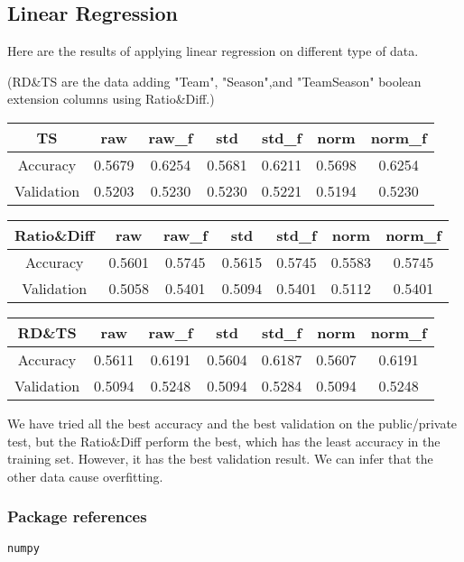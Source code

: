 \subsection*{Linear Regression}

Here are the results of applying linear regression on different type of data.

\noindent
(RD\&TS are the data adding "Team", "Season",and "TeamSeason" boolean extension columns using Ratio\&Diff.) \\

\vspace{6pt}

\begin{tabular}{|c|c|c|c|c|c|c|}
    \hline
    TS         & raw    & raw\_f & std    & std\_f & norm   & norm\_f \\\hline
    Accuracy   & 0.5679 & 0.6254 & 0.5681 & 0.6211 & 0.5698 & 0.6254 \\\hline
    Validation & 0.5203 & 0.5230 & 0.5230 & 0.5221 & 0.5194 & 0.5230 \\\hline
\end{tabular}

\vspace{12pt}

\begin{tabular}{|c|c|c|c|c|c|c|}
    \hline
    Ratio\&Diff& raw    & raw\_f & std    & std\_f & norm   & norm\_f \\\hline
    Accuracy   & 0.5601 & 0.5745 & 0.5615 & 0.5745 & 0.5583 & 0.5745 \\\hline
    Validation & 0.5058 & 0.5401 & 0.5094 & 0.5401 & 0.5112 & 0.5401 \\\hline
\end{tabular}

\vspace{12pt}

\begin{tabular}{|c|c|c|c|c|c|c|}
    \hline
    RD\&TS     & raw    & raw\_f & std    & std\_f & norm   & norm\_f \\\hline
    Accuracy   & 0.5611 & 0.6191 & 0.5604 & 0.6187 & 0.5607 & 0.6191  \\\hline
    Validation & 0.5094 & 0.5248 & 0.5094 & 0.5284 & 0.5094 & 0.5248 \\\hline
\end{tabular}

\vspace{6pt}

We have tried all the best accuracy and the best validation on the public/private test, but the Ratio\&Diff perform the best, which has the least accuracy in the training set. However, it has the best validation result. We can infer that the other data cause overfitting.

\subsubsection*{Package references}
\begin{lstlisting}[language=Python]
numpy
\end{lstlisting}